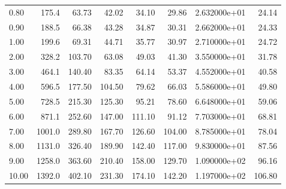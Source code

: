 \begin{tabular}{lrrrrrrr}
0.80  &     175.4 &       63.73 &       42.02 &        34.10 &        29.86 &  2.632000e+01 &      24.14 \\
0.90  &     188.5 &       66.38 &       43.28 &        34.87 &        30.31 &  2.662000e+01 &      24.33 \\
1.00  &     199.6 &       69.31 &       44.71 &        35.77 &        30.97 &  2.710000e+01 &      24.72 \\
2.00  &     328.2 &      103.70 &       63.08 &        49.03 &        41.30 &  3.550000e+01 &      31.78 \\
3.00  &     464.1 &      140.40 &       83.35 &        64.14 &        53.37 &  4.552000e+01 &      40.58 \\
4.00  &     596.5 &      177.50 &      104.50 &        79.62 &        66.03 &  5.586000e+01 &      49.80 \\
5.00  &     728.5 &      215.30 &      125.30 &        95.21 &        78.60 &  6.648000e+01 &      59.06 \\
6.00  &     871.1 &      252.60 &      147.00 &       111.10 &        91.12 &  7.703000e+01 &      68.81 \\
7.00  &    1001.0 &      289.80 &      167.70 &       126.60 &       104.00 &  8.785000e+01 &      78.04 \\
8.00  &    1131.0 &      326.40 &      189.90 &       142.40 &       117.00 &  9.830000e+01 &      87.56 \\
9.00  &    1258.0 &      363.60 &      210.40 &       158.00 &       129.70 &  1.090000e+02 &      96.16 \\
10.00 &    1392.0 &      402.10 &      231.30 &       174.10 &       142.20 &  1.197000e+02 &     106.80 \\
\bottomrule
\end{tabular}
